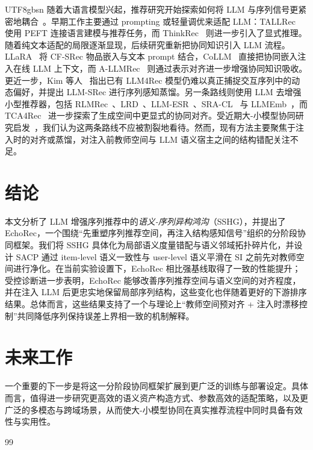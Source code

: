 \documentclass{article}
\begin{document}
\begin{CJK*}{UTF8}{gbsn}
随着大语言模型兴起，推荐研究开始探索如何将 LLM 与序列信号更紧密地耦合~\cite{lin2025survey,zhao2024era}。早期工作主要通过 prompting 或轻量调优来适配 LLM：TALLRec~\cite{bao2023tallrec} 使用 PEFT 连接语言建模与推荐任务，而 ThinkRec~\cite{yu2026thinkrec} 则进一步引入了显式推理。随着纯文本适配的局限逐渐显现，后续研究重新把协同知识引入 LLM 流程。LLaRA~\cite{liao2024llara} 将 CF-SRec 物品嵌入与文本 prompt 结合，CoLLM~\cite{zhang2025collm} 直接把协同嵌入注入在线 LLM 上下文，而 A-LLMRec~\cite{kim2024allmrec} 则通过表示对齐进一步增强协同知识吸收。更近一步，Kim 等人~\cite{kim2025lost} 指出已有 LLM4Rec 模型仍难以真正捕捉交互序列中的动态偏好，并提出 LLM-SRec 进行序列感知蒸馏。另一条路线则使用 LLM 去增强小型推荐器，包括 RLMRec~\cite{ren2024rlmrec}、LRD~\cite{yang2024lrd}、LLM-ESR~\cite{liu2024llmesr}、SRA-CL~\cite{cui2025sracl} 与 LLMEmb~\cite{liu2025llmemb}，而 TCA4Rec~\cite{lin2026tca4rec} 进一步探索了生成空间中更显式的协同对齐。受近期大-小模型协同研究启发~\cite{zhang2026crossscale,lv2025lsc4rec}，我们认为这两条路线不应被割裂地看待。然而，现有方法主要聚焦于注入时的对齐或蒸馏，对注入前教师空间与 LLM 语义宿主之间的结构错配关注不足。

\section{结论}
\label{sec:conclusion}

本文分析了 LLM 增强序列推荐中的\emph{语义-序列异构鸿沟}（SSHG），并提出了 EchoRec，一个围绕“先重塑序列推荐空间，再注入结构感知信号”组织的分阶段协同框架。我们将 SSHG 具体化为局部语义度量错配与语义邻域拓扑碎片化，并设计 SACP 通过 item-level 语义一致性与 user-level 语义平滑在 SI 之前先对教师空间进行净化。在当前实验设置下，EchoRec 相比强基线取得了一致的性能提升；受控诊断进一步表明，EchoRec 能够改善序列推荐空间与语义空间的对齐程度，并在注入 LLM 后更忠实地保留局部序列结构，这些变化也伴随着更好的下游排序结果。总体而言，这些结果支持了一个与理论上“教师空间预对齐 + 注入时漂移控制”共同降低序列保持误差上界相一致的机制解释。

\section{未来工作}
\label{sec:future_work}

一个重要的下一步是将这一分阶段协同框架扩展到更广泛的训练与部署设定。具体而言，值得进一步研究更高效的语义资产构造方式、参数高效的适配策略，以及更广泛的多模态与跨域场景，从而使大-小模型协同在真实推荐流程中同时具备有效性与实用性。

\begin{thebibliography}{99}


\end{thebibliography}
\end{CJK*}
\end{document}
